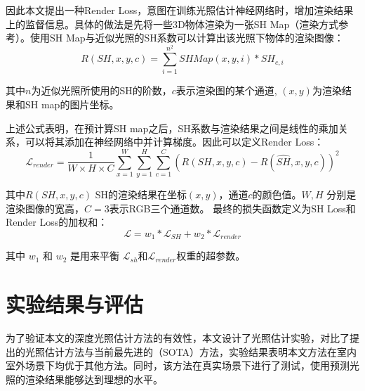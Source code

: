 因此本文提出一种Render Loss，意图在训练光照估计神经网络时，增加渲染结果上的监督信息。具体的做法是先将一些3D物体渲染为一张SH Map（渲染方式参考\cite{green2003spherical}）。使用SH Map与近似光照的SH系数可以计算出该光照下物体的渲染图像：
\begin{equation}
    R(SH, x, y, c) = \sum^{n^2}_{i=1}SHMap(x,y,i)*SH_{c,i}
\end{equation}

其中$n$为近似光照所使用的SH的阶数，$c$表示渲染图的某个通道, $(x, y)$为渲染结果和SH map的图片坐标。

上述公式表明，在预计算SH map之后，SH系数与渲染结果之间是线性的乘加关系，可以将其添加在神经网络中并计算梯度。因此可以定义Render Loss：
\begin{equation}
    \mathcal{L}_{render} = \frac{1}{W\times H\times C} \sum_{x=1}^{W}\sum_{y=1}^{H}\sum_{c=1}^{C}(R(SH,x,y,c)-R(\hat{SH},x,y,c))^{2}
\end{equation}

其中$R(SH,x,y,c)$ SH的渲染结果在坐标$(x,y)$，通道$c$的颜色值。$W, H$ 分别是渲染图像的宽高，$C=3$表示RGB三个通道数。
最终的损失函数定义为SH Loss和Render Loss的加权和：
\begin{equation}
    \label{eq:loss-function}
    \mathcal{L} =w_{1}*\mathcal{L}_{SH}+w_{2}*\mathcal{L}_{render}
\end{equation}

 其中 $w_1$ 和 $w_2$ 是用来平衡 $\mathcal{L}_{sh}$和$\mathcal{L}_{render}$权重的超参数。
\section{实验结果与评估}\label{sec:experiment}
为了验证本文的深度光照估计方法的有效性，本文设计了光照估计实验，对比了提出的光照估计方法与当前最先进的（SOTA）方法，实验结果表明本文方法在室内室外场景下均优于其他方法。同时，该方法在真实场景下进行了测试，使用预测光照的渲染结果能够达到理想的水平。
